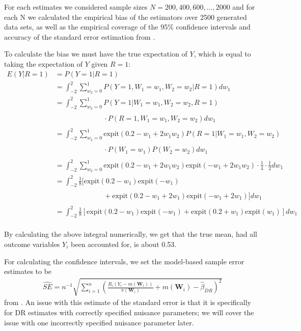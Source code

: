 \documentclass[12pt,twoside]{article}
\newcommand{\expit}{\text{expit}}
\begin{document}
For each estimates we considered sample sizes $N = 200, 400, 600, ..., 2000$ and for each N we calculated the empirical bias of the estimators over 2500 generated data sets, as well as the empirical coverage of the 95\% confidence intervals and accuracy of the standard error estimation from \citet{lunceford_davidian}.

To calculate the bias we must have the true expectation of $Y$, which is equal to taking the expectation of $Y$ given $R = 1$:
\begin{align*}
    E(Y|R = 1) &= P(Y = 1|R = 1)\\
    &= \int_{-2}^{2} \sum_{w_2 = 0}^{1} P(Y = 1, W_1 = w_1, W_2 = w_2|R = 1) dw_1 \\
    & = \int_{-2}^{2} \sum_{w_2 = 0}^{1} P(Y = 1|W_1 = w_1, W_2 = w_2, R = 1) \\
    & \phantom{ = \int_{-2}^{2} \sum_{w_2 = 0}^{1}} \cdot P(R = 1, W_1 = w_1, W_2 = w_2)dw_1 \\
    & = \int_{-2}^{2} \sum_{w_2 = 0}^{1} \expit(0.2 - w_1 + 2w_1w_2)P(R = 1|W_1 = w_1, W_2 = w_2) \\
    &\phantom{ = \int_{-2}^{2} \sum_{w_2 = 0}^{1}} \cdot P(W_1 = w_1)P(W_2 = w_2)dw_1 \\
    & = \int_{-2}^{2} \sum_{w_2 = 0}^{1} \expit(0.2 - w_1 + 2w_1w_2)\expit(-w_1+2w_1w_2) \cdot \frac{1}{4}\cdot \frac{1}{2}dw_1 \\
    & = \int_{-2}^{2} \frac{1}{8}[\expit(0.2 - w_1)\expit(-w_1) \\
    &\phantom{ = \int_{-2}^{2} \sum_{w_2 = 0}^{1}} +\expit(0.2 - w_1 + 2w_1)\expit(-w_1+2w_1)]dw_1 \\
    & = \int_{-2}^{2} \frac{1}{8}[\expit(0.2 - w_1)\expit(-w_1) +\expit(0.2 + w_1)\expit(w_1)]dw_1 \\
\end{align*}

By calculating the above integral numerically, we get that the true mean, had all outcome variables $Y_i$ been accounted for, is about 0.53.

For calculating the confidence intervals, we set the model-based sample error estimates to be 
\begin{align*}
    \hat{SE} = n^{-1} \sqrt{\sum_{i=1}^n \left(\frac{R_i(Y_i - m(\mathbf{W}_i))}{\pi(\mathbf{W}_i)} + m(\mathbf{W}_i) - \hat{\beta}_{DR}\right)^2}
\end{align*}
from \citet{lunceford_davidian}. An issue with this estimate of the standard error is that it is specifically for DR estimates with correctly specified nuisance parameters; we will cover the issue with one incorrectly specified nuisance parameter later.
\end{document}
